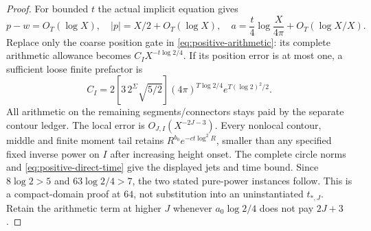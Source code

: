 \begin{proof}
For bounded $t$ the actual implicit equation gives
\[
 p-w=O_T(\log X),\quad |p|=X/2+O_T(\log X),\quad
 a=\frac t4\log\frac{X}{4\pi}+O_T(\log X/X).
\]
Replace only the coarse position gate in
\eqref{eq:positive-arithmetic}: its complete arithmetic allowance
becomes $C_IX^{-t\log2/4}$. If its position error is at most one,
a sufficient loose finite prefactor is
\[
 C_I=2[3\,2^\Sigma\sqrt{5/2}]
          (4\pi)^{T\log2/4}e^{T(\log2)^2/2}.
\]
All arithmetic on the remaining segments/connectors stays paid by
the separate contour ledger. The local error is
$O_{J,I}(X^{-2J-3})$. Every nonlocal contour, middle and finite
moment tail retains $R^{b_0}e^{-ct\log^2R}$, smaller than any
specified fixed inverse power on $I$ after increasing height onset.
The complete circle norms and \eqref{eq:positive-direct-time} give
the displayed jets and time bound. Since $8\log2>5$ and
$63\log2/4>7$, the two stated pure-power instances follow.
This is a compact-domain proof at $64$, not substitution into an
uninstantiated $t_{*,J}$. Retain the arithmetic term at higher $J$
whenever $a_0\log2/4$ does not pay $2J+3$.
\end{proof}

